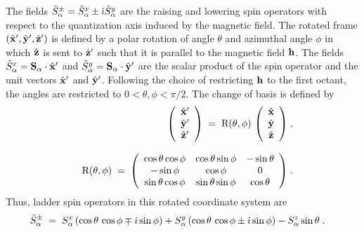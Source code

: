 The fields $\tilde{S}_{\alpha}^{\pm}  = \tilde{S}^{x}_{\alpha}  \pm \im \tilde{S}^{y}_{\alpha} $ are the raising and lowering spin operators with respect to the quantization axis induced by the magnetic field. The rotated frame $(\hat{\bf{x}}^{\prime},\hat{\bf{y}}^{\prime},\hat{\bf{z}}^{\prime})$ is defined by a polar rotation of angle $\theta$ and azimuthal angle $\phi$ in which $\hat{\bf{z}}$ is sent to $\hat{\bf{z}}^{\prime}$ such that it is parallel to the magnetic field $\bf{h}$. The fields $\tilde{S}^{x}_{\alpha}  = \bf{S}_{\alpha} \cdot\hat{\bf{x}}^{\prime}$ and $\tilde{S}^{y}_{\alpha}  = \bf{S}_{\alpha} \cdot\hat{\bf{y}}^{\prime}$ are the scalar product of the spin operator and the unit vectors $\hat{\bf{x}}^{\prime}$ and $\hat{\bf{y}}^{\prime}$. Following the choice of restricting $\bf{h}$ to the first octant, the angles are restricted to $0<\theta,\phi<\pi/2$. The change of basis is defined by
\begin{equation}
\begin{split}
    \left(
    \begin{array}{c}
         \hat{\bf{x}}^{\prime}  \\
         \hat{\bf{y}}^{\prime} \\
         \hat{\bf{z}}^{\prime}
    \end{array} \right)
    \; = \; \mathrm{R}(\theta,\phi) \, \left(
    \begin{array}{c}
         \hat{\bf{x}}  \\
         \hat{\bf{y}} \\
         \hat{\bf{z}}
    \end{array} \right)& \; , \\[8pt] \quad %
    \mathrm{R}(\theta,\phi) \; = \;
    \left(
    \begin{array}{ccc}
            \cos \theta \cos \phi & \cos \theta \sin  \phi  & - \sin \theta   \\
            - \sin \phi & \cos  \phi  & 0 \\
            \sin \theta \cos \phi & \sin \theta \sin  \phi  &  \cos \theta
    \end{array} \right)& \; .
\end{split}
\end{equation}
Thus, ladder spin operators in this rotated coordinate system are
\begin{align}
    \tilde{S}^{\pm}_{\alpha}  \; &= \; S^{x}_{\alpha}  \left( \cos \theta \, \cos \phi \mp \im \sin \phi   \right)+ S^{y}_{\alpha} \left( \cos \theta \, \cos \phi \pm \im \sin \phi   \right)- S^{z}_{\alpha}  \sin \theta  \; .%
\end{align}%
